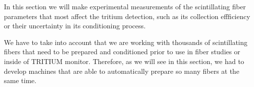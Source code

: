 In this section we will make experimental measurements of the scintillating fiber parameters that most affect the tritium detection, such as its collection effficiency or their uncertainty in its conditioning process.

We have to take into account that we are working with thousands of scintillating fibers that need to be prepared and conditioned prior to use in fiber studies or inside of TRITIUM monitor. Therefore, as we will see in this section, we had to develop machines that are able to automatically prepare so many fibers at the same time.